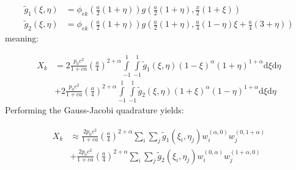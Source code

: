 \documentclass[12pt,letterpaper]{article}
\theoremstyle{definition}
\numberwithin{equation}{subsection}
\newcommand{\dd}{\text{d}}
\begin{document}
\begin{align}
    \tilde g_1 (\xi, \eta) &= \phi_{ek}\left(\frac{a}{2}(1+\eta)\right) g\left(\frac{a}{2}(1+\eta), \frac{x}{2}(1+ \xi) \right) \\
    \tilde g_2 (\xi, \eta) &= \phi_{ek}\left(\frac{a}{2}(1+\eta)\right) g\left(\frac{a}{2}(1+\eta), \frac{a}{4}(1-\eta)\xi + \frac{a}{4}(3+\eta)\right)
\end{align}
meaning:

\begin{align*}
    X_{k} &= 2 \frac{p_0 c^2}{1+ca} \left(\frac{a}{4}\right)^{2+\alpha} \int\limits_{-1}^1\int\limits_{-1}^1 \tilde g_1(\xi, \eta) (1-\xi)^{\alpha} (1 + \eta)^{1+\alpha}\dd \xi \dd \eta \\
    &+ 2 \frac{p_0 c^2}{1+ca} \left(\frac{a}{4}\right)^{2+\alpha} \int\limits_{-1}^1\int\limits_{-1}^1 \tilde g_2(\xi, \eta) (1+\xi)^{\alpha} (1 - \eta)^{1+\alpha}\dd \xi \dd \eta
\end{align*}
Performing the Gauss-Jacobi quadrature yields:

\begin{align}
\begin{split}
    X_k &\approx  \frac{2 p_0 c^2}{1+ca} \left(\frac{a}{4}\right)^{2+\alpha} \sum_i \sum_j \tilde g_1(\xi_i, \eta_j) w_i^{(\alpha,0)}w_j^{(0,1+\alpha)}\\
    &+ \frac{2 p_0 c^2}{1+ca} \left(\frac{a}{4}\right)^{2+\alpha} \sum_i \sum_j \tilde g_2(\xi_i, \eta_j) w_i^{(0,\alpha)}w_j^{(1+\alpha, 0)}
\end{split}
\end{align}
\end{document}
